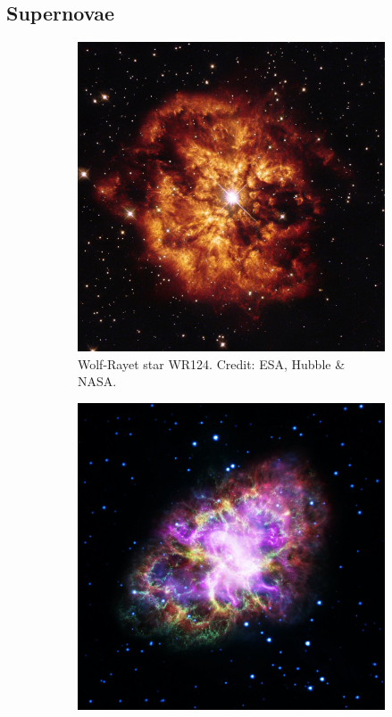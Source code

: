 \subsection{Supernovae}
\begin{figure}[tb]
    \centering
    \begin{subfigure}{0.495\textwidth}
        \includegraphics[width=\textwidth]{graphics/massive_stars/wr124}
        \caption{Wolf-Rayet star WR124. Credit: ESA, Hubble \& NASA.}
        \label{fig:massive_stars:wr124}
    \end{subfigure}
    \begin{subfigure}{0.495\textwidth}
        \includegraphics[width=\textwidth]{graphics/massive_stars/crab_nebula}

\end{subfigure}
\end{figure}

